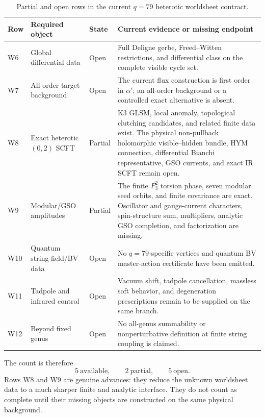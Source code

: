 \documentclass[11pt]{article}
\theoremstyle{definition}
\theoremstyle{remark}
\begin{document}
\begin{table}[htbp]
\centering
\small
\begin{tabularx}{\textwidth}{@{}p{}p{}p{}X@{}}
\toprule
Row & Required object & State & Current evidence or missing endpoint \\
\midrule
W6 & Global differential data & Open &
Full Deligne gerbe, Freed--Witten restrictions, and differential class on the
complete visible cycle set. \\
W7 & All-order target background & Open &
The current flux construction is first order in \(\alpha'\); an all-order
background or a controlled exact alternative is absent. \\
W8 & Exact heterotic \((0,2)\) SCFT & Partial &
K3 GLSM, local anomaly, topological clutching candidates, and related finite
data exist.  The physical non-pullback holomorphic visible--hidden bundle,
HYM connection, differential Bianchi representative, GSO currents, and exact
IR SCFT remain open. \\
W9 & Modular/GSO amplitudes & Partial &
The finite \(F_3^2\) torsion phase, seven modular seed orbits, and finite
covariance are exact.  Oscillator and gauge-current characters,
spin-structure sum, multipliers, analytic GSO completion, and factorization
are missing. \\
W10 & Quantum string-field/BV data & Open &
No \(q=79\)-specific vertices and quantum BV master-action certificate have
been emitted. \\
W11 & Tadpole and infrared control & Open &
Vacuum shift, tadpole cancellation, massless soft behavior, and degeneration
prescriptions remain to be supplied on the same branch. \\
W12 & Beyond fixed genus & Open &
No all-genus summability or nonperturbative definition at finite string
coupling is claimed. \\
\bottomrule
\end{tabularx}
\caption{Partial and open rows in the current \(q=79\) heterotic worldsheet
contract.}
\label{tab:q79-open}
\end{table}

The count is therefore
\[
\boxed{5\ \text{available},\qquad 2\ \text{partial},\qquad 5\ \text{open}.}
\]
Rows W8 and W9 are genuine advances: they reduce the unknown worldsheet data
to a much sharper finite and analytic interface.  They do not count as
complete until their missing objects are constructed on the same physical
background.
\end{document}

